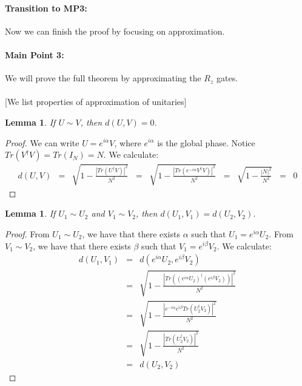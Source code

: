\documentclass[11pt]{article}
\def\({\begin{eqnarray*}}
\def\){\end{eqnarray*}}
\newtheorem{lemma}[theorem]{Lemma}
\begin{document}
\newpage

\paragraph{Transition to MP3:}
Now we can finish the proof by focusing on approximation.

\paragraph{Main Point 3:}
We will prove the full theorem by approximating the $R_z$ gates. \\
\mbox{} \\ \hspace*{1cm}
   [We list properties of approximation of unitaries] \\

\begin{lemma}
\label{lem:hs-distance-to-itself-is-zero}
If $U \sim V$, then $d(U,V) = 0$. 
\end{lemma}

\begin{proof}
We can write $U = e^{i\alpha} V$, where $e^{i\alpha}$ is the global phase.
Notice $Tr( V^\dagger V ) = Tr( I_N ) = N$.
We calculate:
\(
d(U,V) &=& \sqrt{ 1 - \frac{ | Tr( U^\dagger V ) |^2 }{ N^2 } } 
 \;\;=\;\; \sqrt{ 1 - \frac{ | Tr( e^{-i\alpha} V^\dag V ) |^2 }{ N^2 } }
 \;\;=\;\; \sqrt{ 1 - \frac{ | N |^2 }{ N^2 } } 
 \;\;=\;\; 0
\)
\end{proof}

\begin{lemma}
\label{lem:hs-distance-and-global-phase}
If $U_1 \sim U_2$ and $V_1 \sim V_2$, then $d(U_1,V_1) = d(U_2,V_2)$.
\end{lemma}

\begin{proof}
From $U_1 \sim U_2$, we have that 
there exists $\alpha$ such that $U_1 = e^{i\alpha} U_2$.
From $V_1 \sim V_2$, we have that 
there exists $\beta$  such that $V_1 = e^{i\beta} V_2$.
We calculate:
\(
d(U_1,V_1) 
&=&
d(e^{i\alpha} U_2, e^{i\beta} V_2)
\\
&=&
\sqrt{ 1 - \frac{ | Tr( (e^{i\alpha} U_2)^\dagger (e^{i\beta} V_2) ) |^2 }{ N^2 } }
\\
&=&
\sqrt{ 1 - \frac{ | e^{-i\alpha} e^{i\beta} Tr( U_2^\dagger V_2 ) |^2 }{ N^2 } }
\\
&=&
\sqrt{ 1 - \frac{ | Tr( U_2^\dagger V_2 ) |^2 }{ N^2 } }
\\
&=&
d(U_2,V_2)
\)
\end{proof}
\end{document}
